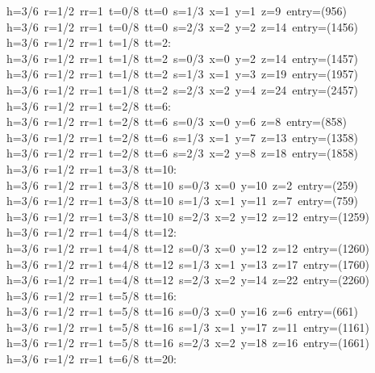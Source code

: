 \begin{tabbing}
h=3/6\ r=1/2\ rr=1\ t=0/8\ tt=0\ s=1/3\ x=1\ y=1\ z=9\ entry=(956)\\[0pt]
h=3/6\ r=1/2\ rr=1\ t=0/8\ tt=0\ s=2/3\ x=2\ y=2\ z=14\ entry=(1456)\\[0pt]
h=3/6\ r=1/2\ rr=1\ t=1/8\ tt=2:\\[0pt]
h=3/6\ r=1/2\ rr=1\ t=1/8\ tt=2\ s=0/3\ x=0\ y=2\ z=14\ entry=(1457)\\[0pt]
h=3/6\ r=1/2\ rr=1\ t=1/8\ tt=2\ s=1/3\ x=1\ y=3\ z=19\ entry=(1957)\\[0pt]
h=3/6\ r=1/2\ rr=1\ t=1/8\ tt=2\ s=2/3\ x=2\ y=4\ z=24\ entry=(2457)\\[0pt]
h=3/6\ r=1/2\ rr=1\ t=2/8\ tt=6:\\[0pt]
h=3/6\ r=1/2\ rr=1\ t=2/8\ tt=6\ s=0/3\ x=0\ y=6\ z=8\ entry=(858)\\[0pt]
h=3/6\ r=1/2\ rr=1\ t=2/8\ tt=6\ s=1/3\ x=1\ y=7\ z=13\ entry=(1358)\\[0pt]
h=3/6\ r=1/2\ rr=1\ t=2/8\ tt=6\ s=2/3\ x=2\ y=8\ z=18\ entry=(1858)\\[0pt]
h=3/6\ r=1/2\ rr=1\ t=3/8\ tt=10:\\[0pt]
h=3/6\ r=1/2\ rr=1\ t=3/8\ tt=10\ s=0/3\ x=0\ y=10\ z=2\ entry=(259)\\[0pt]
h=3/6\ r=1/2\ rr=1\ t=3/8\ tt=10\ s=1/3\ x=1\ y=11\ z=7\ entry=(759)\\[0pt]
h=3/6\ r=1/2\ rr=1\ t=3/8\ tt=10\ s=2/3\ x=2\ y=12\ z=12\ entry=(1259)\\[0pt]
h=3/6\ r=1/2\ rr=1\ t=4/8\ tt=12:\\[0pt]
h=3/6\ r=1/2\ rr=1\ t=4/8\ tt=12\ s=0/3\ x=0\ y=12\ z=12\ entry=(1260)\\[0pt]
h=3/6\ r=1/2\ rr=1\ t=4/8\ tt=12\ s=1/3\ x=1\ y=13\ z=17\ entry=(1760)\\[0pt]
h=3/6\ r=1/2\ rr=1\ t=4/8\ tt=12\ s=2/3\ x=2\ y=14\ z=22\ entry=(2260)\\[0pt]
h=3/6\ r=1/2\ rr=1\ t=5/8\ tt=16:\\[0pt]
h=3/6\ r=1/2\ rr=1\ t=5/8\ tt=16\ s=0/3\ x=0\ y=16\ z=6\ entry=(661)\\[0pt]
h=3/6\ r=1/2\ rr=1\ t=5/8\ tt=16\ s=1/3\ x=1\ y=17\ z=11\ entry=(1161)\\[0pt]
h=3/6\ r=1/2\ rr=1\ t=5/8\ tt=16\ s=2/3\ x=2\ y=18\ z=16\ entry=(1661)\\[0pt]
h=3/6\ r=1/2\ rr=1\ t=6/8\ tt=20:\\[0pt]

\end{tabbing}
